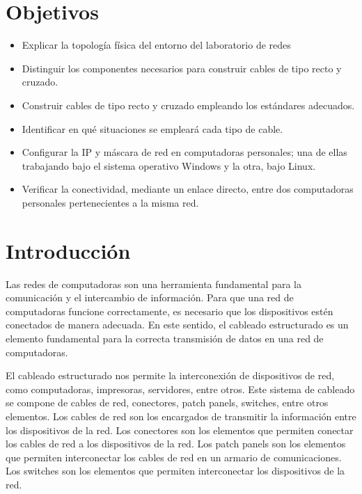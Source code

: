 \setcounter{page}{1}

\section{Objetivos}
    \begin{itemize}
        \item Explicar la topología física del entorno del laboratorio de redes
        \item Distinguir los componentes necesarios para construir cables de tipo recto y cruzado.
        \item Construir cables de tipo recto y cruzado empleando los estándares adecuados.
        \item Identificar en qué situaciones se empleará cada tipo de cable.
        \item Configurar la IP y máscara de red en computadoras personales; una de ellas trabajando bajo el sistema  operativo Windows y la otra, bajo Linux.
        \item Verificar la conectividad, mediante un enlace directo, entre dos computadoras personales pertenecientes a la misma red.
    \end{itemize}

\section{Introducción}

    Las redes de computadoras son una herramienta fundamental para la comunicación y el intercambio de información. Para que una red de computadoras funcione correctamente, es necesario que los dispositivos estén conectados de manera adecuada. En este sentido, el cableado estructurado es un elemento fundamental para la correcta transmisión de datos en una red de computadoras.

    El cableado estructurado nos permite la interconexión de dispositivos de red, como computadoras, impresoras, servidores, entre otros. Este sistema de cableado se compone de cables de red, conectores, patch panels, switches, entre otros elementos. Los cables de red son los encargados de transmitir la información entre los dispositivos de la red. Los conectores son los elementos que permiten conectar los cables de red a los dispositivos de la red. Los patch panels son los elementos que permiten interconectar los cables de red en un armario de comunicaciones. Los switches son los elementos que permiten interconectar los dispositivos de la red.

